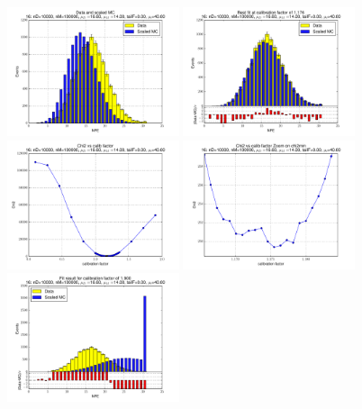 
 \begin{figure}[htbp] \begin{center} 
\includegraphics[width=0.45\textwidth]{../FIGURES/16/FIG_Data_and_scaled_MC.pdf} 
\includegraphics[width=0.45\textwidth]{../FIGURES/16/FIG_Best_fit_at_calibration_factor_of_1_176.pdf} 
\includegraphics[width=0.45\textwidth]{../FIGURES/16/FIG_Chi2_vs_calib_factor.pdf} 
\includegraphics[width=0.45\textwidth]{../FIGURES/16/FIG_Chi2_vs_calib_factor_Zoom_on_chi2min.pdf} 
\includegraphics[width=0.45\textwidth]{../FIGURES/16/FIG_Fit_result_for_calibration_factor_of_1_900.pdf} 

\end{center}
\end{figure}
